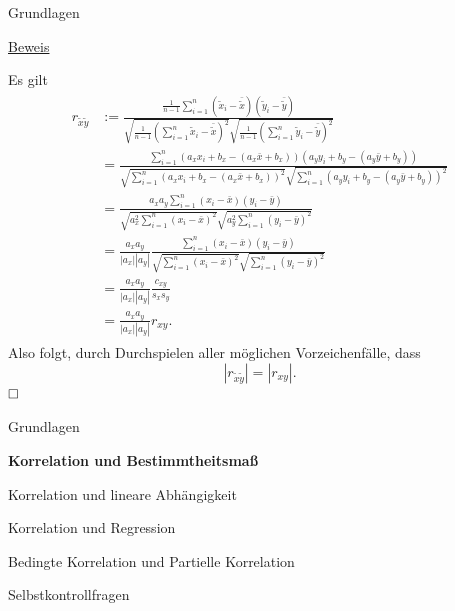 \documentclass[
  8pt,
  ignorenonframetext,
]{beamer}
\begin{document}
\begin{frame}{Grundlagen}
\protect\hypertarget{grundlagen-9}{}
\footnotesize
\vspace{1mm}

\underline{Beweis}

Es gilt \tiny \begin{align}
\begin{split}
r_{\tilde{x}\tilde{y}}
& := \frac{\frac{1}{n-1}\sum_{i=1}^n (\tilde{x}_i - \bar{\tilde{x}})(\tilde{y}_i - \bar{\tilde{y}})}
        {\sqrt{\frac{1}{n-1}(\sum_{i=1}^n\tilde{x}_i - \bar{\tilde{x}})^2} \sqrt{\frac{1}{n-1}(\sum_{i=1}^n\tilde{y}_i - \bar{\tilde{y}})^2}}
\\
&  = \frac{\sum_{i=1}^n (a_x x_i + b_x - (a_x\bar{x} + b_x))(a_y y_i + b_y - (a_y \bar{y} + b_y))}
          {\sqrt{\sum_{i=1}^n (a_x x_i + b_x - (a_x \bar{x} + b_x))^2}\sqrt{\sum_{i=1}^n (a_y y_i + b_y - (a_y \bar{y} + b_y))^2}}
\\
&  = \frac{a_x a_y\sum_{i=1}^n (x_i-\bar{x})(y_i-\bar{y})}
          {\sqrt{a_x^2\sum_{i=1}^n (x_i  - \bar{x})^2}\sqrt{a_y^2\sum_{i=1}^n (y_i - \bar{y})^2}}
\\
&  = \frac{a_x a_y}{|a_x||a_y|}
     \frac{\sum_{i=1}^n (x_i-\bar{x})(y_i-\bar{y})}
          {\sqrt{\sum_{i=1}^n (x_i  - \bar{x})^2}\sqrt{\sum_{i=1}^n (y_i - \bar{y})^2}}
\\
&  = \frac{a_x a_y}{|a_x||a_y|}\frac{c_{xy}}{s_x s_y}
\\
&  = \frac{a_x a_y}{|a_x||a_y|}r_{xy}.
\end{split}
\end{align} \footnotesize Also folgt, durch Durchspielen aller möglichen
Vorzeichenfälle, dass \begin{equation}
|r_{\tilde{x}\tilde{y}}| = |r_{xy}|.
\end{equation} \(\hfill\Box\)
\end{frame}

\begin{frame}{}
\protect\hypertarget{section-4}{}
\vfill
\large

Grundlagen

\textbf{Korrelation und Bestimmtheitsmaß}

Korrelation und lineare Abhängigkeit

Korrelation und Regression

Bedingte Korrelation und Partielle Korrelation

Selbstkontrollfragen

\vfill
\end{frame}
\end{document}
